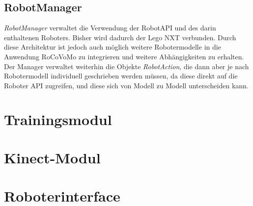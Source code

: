 \subsection{RobotManager}
\textit{RobotManager} verwaltet die Verwendung der RobotAPI und des darin enthaltenen Roboters. Bisher wird dadurch der Lego NXT verbunden. Durch diese Architektur ist jedoch auch m\"oglich weitere Robotermodelle in die Anwendung RoCoVoMo zu integrieren und weitere Abh\"angigkeiten zu erhalten.
\newline
Der Manager verwaltet weiterhin die Objekte \textit{RobotAction}, die dann aber je nach Robotermodell individuell geschrieben werden m\"ussen, da diese direkt auf die Roboter \gls{API} zugreifen, und diese sich von Modell zu Modell unterscheiden kann.

\section{Trainingsmodul}

\section{Kinect-Modul}

\section{Roboterinterface}